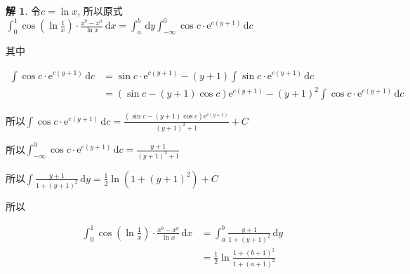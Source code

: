 \documentclass[a4paper,12pt]{article}
\theoremstyle{definition}
\newtheorem*{sol}{解}
\begin{document}
\begin{sol}
    令$c=\ln x$, 所以原式 $\int_{0}^{1} \cos\left(\ln\frac{1}{x}\right) \cdot \frac{x^b - x^a}{\ln x} \, \mathrm{d}x=\int_a^b\,\mathrm{d}y\int_{-\infty}^0\cos c\cdot\mathrm{e}^{c(y+1)}\,\mathrm{d}c$

    其中

    \begin{align*}
        \int\cos c\cdot\mathrm{e}^{c(y+1)}\,\mathrm{d}c
         & =\sin c\cdot\mathrm{e}^{c(y+1)}-(y+1)\int\sin c\cdot\mathrm{e}^{c(y+1)}\,\mathrm{d}c            \\
         & =(\sin c-(y+1)\cos c)\mathrm{e}^{c(y+1)}-(y+1)^2\int\cos c\cdot\mathrm{e}^{c(y+1)}\,\mathrm{d}c
    \end{align*}

    所以$\int\cos c\cdot\mathrm{e}^{c(y+1)}\,\mathrm{d}c=\frac{(\sin c-(y+1)\cos c)\mathrm{e}^{c(y+1)}}{(y+1)^2+1}+C$

    所以$\int_{-\infty}^0\cos c\cdot\mathrm{e}^{c(y+1)}\,\mathrm{d}c=\frac{y+1}{(y+1)^2+1}$

    所以$\int\frac{y+1}{1+(y+1)^2}\,\mathrm{d}y=\frac{1}{2}\ln(1+(y+1)^2)+C$

    所以

    \begin{align*}
        \int_{0}^{1} \cos\left(\ln\frac{1}{x}\right) \cdot \frac{x^b - x^a}{\ln x} \, \mathrm{d}x
         & =\int_a^b\frac{y+1}{1+(y+1)^2}\,\mathrm{d}y \\
         & =\frac{1}{2}\ln\frac{1+(b+1)^2}{1+(a+1)^2}
    \end{align*}
\end{sol}
\end{document}
